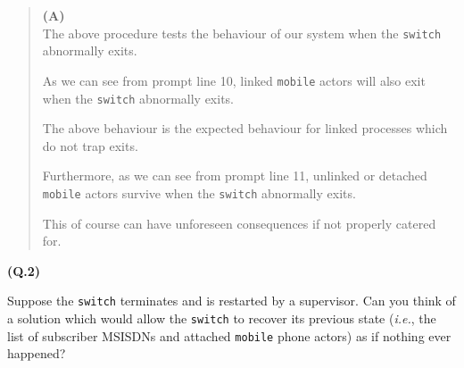 \documentclass{article}
\newcommand\Que[2]{%
\vspace{10pt}
{\large\textbf{(Q.#1)}}

\vspace{5pt}
#2
}
\newenvironment{ans}
    {\begin{quote}{\large\textbf{(A)}}\\\vspace{5pt}}
    {\end{quote}}
\begin{document}
\begin{ans}
The above procedure tests the behaviour of our system when the
\texttt{switch} abnormally exits.

As we can see from prompt line 10, linked \texttt{mobile} actors
will also exit when the \texttt{switch} abnormally exits.

The above behaviour is the expected behaviour for linked
processes which do not trap exits.

Furthermore, as we can see from prompt line 11, unlinked or
detached \texttt{mobile} actors survive when the \texttt{switch}
abnormally exits.

This of course can have unforeseen consequences if not properly
catered for.
\end{ans}

\Que{2}{
Suppose the \texttt{switch} terminates and is restarted by a
supervisor. Can you think of a solution which would allow the
\texttt{switch} to recover its previous state (\emph{i.e.}, the
list of subscriber MSISDNs and attached \texttt{mobile} phone
actors) as if nothing ever happened?
}
\end{document}
